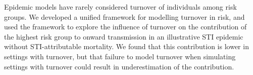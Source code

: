 Epidemic models have rarely considered turnover of individuals among risk groups.
We developed a unified framework for modelling turnover in risk,
and used the framework to explore the influence of turnover on 
the contribution of the highest risk group to onward transmission in an
illustrative STI epidemic without STI-attributable mortality.
We found that this contribution is lower in settings with turnover,
but that failure to model turnover when simulating settings with turnover
could result in underestimation of the contribution.
